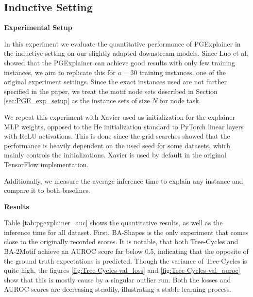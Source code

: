 \subsection{Inductive Setting}
\label{sec:ind_results}

\textbf{Experimental Setup} \par
In this experiment we evaluate the quantitative performance of PGExplainer in the inductive setting on our slightly adapted downstream models. Since Luo et al. \cite{luo2020parameterized} showed that the PGExplainer can achieve good results with only few training instances, we aim to replicate this for $a=30$ training instances, one of the original experiment settings. Since the exact instances used are not further specified in the paper, we treat the motif node sets described in Section \ref{sec:PGE_exp_setup} as the instance sets of size $N$ for node task.

We repeat this experiment with Xavier \cite{glorot2010understanding} used as initialization for the explainer MLP weights, opposed to the He \cite{he2015delving} initialization standard to PyTorch linear layers with ReLU activations. This is done since the grid searches showed that the performance is heavily dependent on the used seed for some datasets, which mainly controls the initializations. Xavier is used by default in the original TensorFlow \cite{tensorflow2015-whitepaper} implementation.

Additionally, we measure the average inference time to explain any instance and compare it to both baselines. \bigskip


\textbf{Results}\par
Table \ref{tab:pgexplainer_auc} shows the quantitative results, as well as the inference time for all dataset. First, BA-Shapes is the only experiment that comes close to the originally recorded scores. It is notable, that both Tree-Cycles and BA-2Motif achieve an AUROC score far below $0.5$, indicating that the opposite of the ground truth expectations is predicted. Though the variance of Tree-Cycles is quite high, the figures \ref{fig:Tree-Cycles-val_loss} and \ref{fig:Tree-Cycles-val_auroc} show that this is mostly cause by a singular outlier run. Both the losses and AUROC scores are decreasing steadily, illustrating a stable learning process. 


